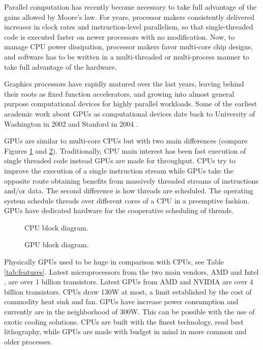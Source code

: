 \documentclass{comjnl}
\begin{document}
Parallel computation has recently become necessary to take full advantage of the gains allowed by Moore's law. For years, processor makers consistently delivered increases in clock rates and instruction-level parallelism, so that single-threaded code is executed faster on newer processors with no modification. Now, to manage CPU power dissipation, processor makers favor multi-core chip designs, and software has to be written in a multi-threaded or multi-process manner to take full advantage of the hardware.

Graphics processors have rapidly matured over the last years, leaving behind their roots as fixed function accelerators, and growing into almost general purpose computational devices for highly parallel workloads. Some of the earliest academic work about GPUs as computational devices date back to University of Washington in 2002 \cite{Thompson:2002:UMG:774861.774894} and Stanford in 2004 \cite{Buck:2004:BGS:1015706.1015800}. 

GPUs are similar to multi-core CPUs but with two main differences (compare Figures \ref{fig:cpu} and \ref{fig:gpu}). Traditionally, CPU main interest has been fast execution of single threaded code instead GPUs are made for throughput. CPUs try to improve the execution of a single instruction stream while GPUs take the opposite route obtaining benefits from massively threaded streams of instructions and/or data. The second difference is how threads are scheduled. The operating system schedule threads over different cores of a CPU in a preemptive fashion. GPUs have dedicated hardware for the cooperative scheduling of threads.

\begin{figure}[h]
\centering
{}
\caption{CPU block diagram.}
\label{fig:cpu}
\end{figure}

\begin{figure}[h]
\centering
{}
\caption{GPU block diagram.}
\label{fig:gpu}
\end{figure}

Physically GPUs used to be huge in comparison with CPUs, see Table \ref{tab:features}. Latest microprocessors from the two main vendors, AMD \cite{amd} and Intel \cite{intel}, are over 1 billion transistors. Latest GPUs from AMD and NVIDIA \cite{nvidia} are over 4 billion transistors. CPUs draw 130W at most, a limit established by the cost of commodity heat sink and fan. GPUs have increase power consumption and currently are in the neighborhood of 300W. This can be possible with the use of exotic cooling solutions. CPUs are built with the finest technology, read best lithography, while GPUs are made with budget in mind in more common and older processes.
\end{document}
